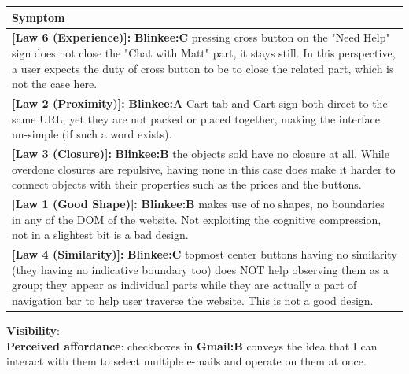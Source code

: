 \documentclass[a4paper,11pt,oneside]{scrreprt}
\begin{document}
\bigskip

\bigskip

\begin{tabularx}{\textwidth}{|X|}
	\hline
	\textbf{Symptom}\\
	\hline
	\textbf{{[Law 6 (Experience)]:}} \textbf{Blinkee:C} pressing cross button on the "Need Help" sign does not close the "Chat with Matt" part, it stays still. In this perspective, a user expects the duty of cross button to be to close the related part, which is not the case here.\\
	\hline
	\textbf{{[Law 2 (Proximity)]:}} \textbf{Blinkee:A} Cart tab and Cart sign both direct to the same URL, yet they are not packed or placed together, making the interface un-simple (if such a word exists). \\
	\hline
	\textbf{{[Law 3 (Closure)]:}} \textbf{Blinkee:B} the objects sold have no closure at all. While overdone closures are repulsive, having none in this case does make it harder to connect objects with their properties such as the prices and the buttons. \\
	\hline
	\textbf{{[Law 1 (Good Shape)]:}} \textbf{Blinkee:B} makes use of no shapes, no boundaries in any of the DOM of the website. Not exploiting the cognitive compression, not in a slightest bit is a bad design. \\
	\hline
	\textbf{{[Law 4 (Similarity)]:}} \textbf{Blinkee:C} topmost center buttons having no similarity (they having no indicative boundary too) does NOT help observing them as a group; they appear as individual parts while they are actually a part of navigation bar to help user traverse the website. This is not a good design.\\
	\hline
\end{tabularx}

\bigskip

\bigskip

\textbf{Visibility}:\\


\textbf{Perceived affordance}: checkboxes in \textbf{Gmail:B} conveys the idea that I can interact with them to select multiple e-mails and operate on them at once.\\
\end{document}
